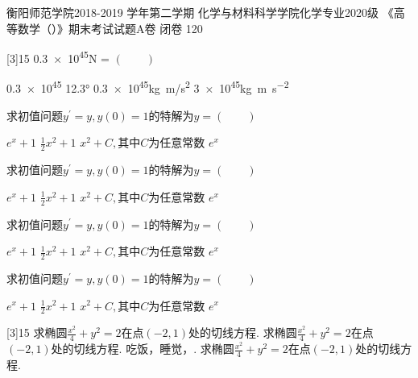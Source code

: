 \documentclass[addtable,answer,twoside,12pt]{hnuexam}
\begin{document}
\examinformation%
{衡阳师范学院2018-2019 学年第二学期}%
{化学与材料科学学院化学专业2020级}%
{《高等数学（）》期末考试试题A卷}%
{闭卷}%
{120}%

\vspace{-1.2em}

\sectiongradetable

\begin{questions}
[3]{15}
\question
\num{.3e45}\si{\newton} = \hfill $(\qquad)$

\begin{oneparchoices}
	\choice \num{.3e45}
	\choice	\ang{12.3}
	\CorrectChoice \num{.3e45}\si{kg.m/s^2}
	\choice \num{3e45}\si{\kilo\gram\metre\per\square\second}
\end{oneparchoices}

\question
求初值问题$y^\prime=y,y(0)=1$的特解为$y=$\hfill $(\qquad)$
	
\begin{oneparchoices}
	\choice $e^x+1$
	\choice	$\frac{1}{2}x^2+1$
	\choice $x^2+C,\text{其中}C$为任意常数
	\CorrectChoice $e^x$
\end{oneparchoices}

\question
求初值问题$y^\prime=y,y(0)=1$的特解为$y=$\hfill $(\qquad)$

\begin{oneparchoices}
	\choice $e^x+1$
	\choice	$\frac{1}{2}x^2+1$
	\choice $x^2+C,\text{其中}C$为任意常数
	\CorrectChoice $e^x$
\end{oneparchoices}


\question
求初值问题$y^\prime=y,y(0)=1$的特解为$y=$\hfill $(\qquad)$

\begin{oneparchoices}
	\choice $e^x+1$
	\choice	$\frac{1}{2}x^2+1$
	\choice $x^2+C,\text{其中}C$为任意常数
	\CorrectChoice $e^x$
\end{oneparchoices}


\question
求初值问题$y^\prime=y,y(0)=1$的特解为$y=$\hfill $(\qquad)$
	
\begin{oneparchoices}
	\choice $e^x+1$
	\choice	$\frac{1}{2}x^2+1$
	\choice $x^2+C,\text{其中}C$为任意常数
	\CorrectChoice $e^x$
\end{oneparchoices}

[3]{15}
\question 求椭圆$\frac{x^2}{4}+y^2=2$在点$(-2,1)$处的切线方程\fillin[$x-2y+4=0$][1.5in].
\question 求椭圆$\frac{x^2}{4}+y^2=2$在点$(-2,1)$处的切线方程\fillin[$x-2y+4=0$][2in].
\question 吃饭，睡觉，\fillin[打豆豆][0.5in].	
\question 求椭圆$\frac{x^2}{4}+y^2=2$在点$(-2,1)$处的切线方程\fillin[$x-2y+4=0$][2in].
	

\end{questions}
\end{document}
